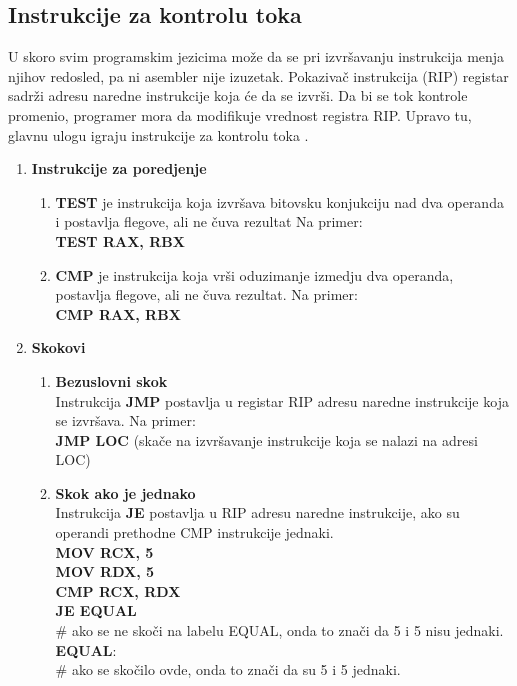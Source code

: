 \documentclass[a4paper]{article}
\begin{document}
\subsection{\textbf{Instrukcije za kontrolu toka}}
U skoro svim programskim jezicima mo\v ze da se pri izvr\v savanju instrukcija menja njihov redosled, pa ni asembler nije izuzetak.
Pokaziva\v c instrukcija (RIP) registar sadr\v zi adresu naredne instrukcije koja \' ce da se izvr\v si. Da bi se tok kontrole promenio, 
programer mora da modifikuje vrednost registra RIP. Upravo tu, glavnu ulogu igraju instrukcije za kontrolu toka \cite{x86Assembly}.

\begin{enumerate} %

\item{\textbf{Instrukcije za poredjenje}} %
	\begin{enumerate} 
	\item{\textbf{TEST} je instrukcija koja izvr\v sava bitovsku konjukciju nad dva operanda i postavlja flegove, ali ne \v cuva rezultat Na primer:} \\
	\textbf{TEST RAX, RBX} 
	\item{\textbf{CMP} je instrukcija koja vr\v si oduzimanje izmedju dva operanda, postavlja flegove, ali ne \v cuva rezultat. Na primer:} \\
	\textbf{CMP RAX, RBX}
	\end {enumerate}


\item{\textbf{Skokovi}} %
\begin{enumerate}
\item{\textbf{Bezuslovni skok}}\\ 
    Instrukcija \textbf{JMP} postavlja u registar RIP adresu naredne instrukcije koja se izvr\v sava. Na primer: \\
	\textbf{JMP LOC} (ska\v ce na izvr\v savanje instrukcije koja se nalazi na adresi LOC)\\
\item{\textbf{Skok ako je jednako}}\\
    Instrukcija \textbf{JE} postavlja u RIP adresu naredne instrukcije, ako su operandi prethodne CMP instrukcije jednaki.\\ 
	\textbf{MOV RCX, 5}\\
	\textbf{MOV RDX, 5}\\
	\textbf{CMP RCX, RDX}\\
	\textbf{JE EQUAL}\\
	\# ako se ne sko\v ci na labelu EQUAL, onda to zna\v ci da  5 i 5 nisu jednaki.\\
	\textbf{EQUAL}:\\
	\# ako se sko\v cilo ovde, onda to zna\v ci da su 5 i 5 jednaki. \\


\end{enumerate}
\end{enumerate}
\end{document}
